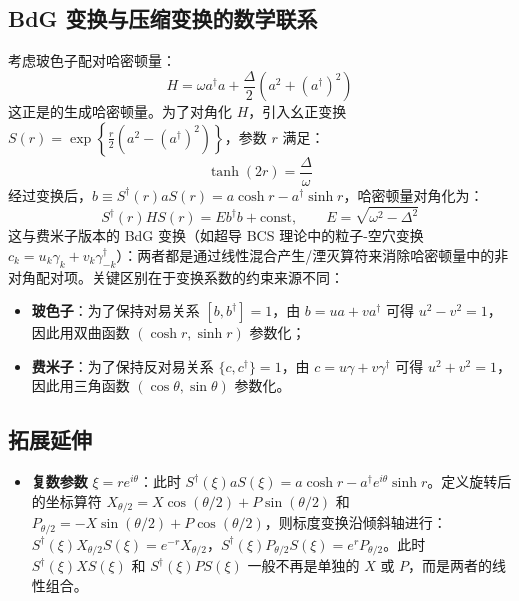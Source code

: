 \subsection{BdG 变换与压缩变换的数学联系}

考虑玻色子配对哈密顿量：
\[
H = \omega a^\dagger a + \frac{\Delta}{2}\left( a^2 + (a^\dagger)^2 \right)
\]
这正是的生成哈密顿量。为了对角化 $H$，引入幺正变换 $S(r) = \exp\left\{ \frac{r}{2}(a^2 - (a^\dagger)^2) \right\}$，参数 $r$ 满足：
\[
\tanh(2r) = \frac{\Delta}{\omega}
\]
经过变换后，$b \equiv S^\dagger(r) a S(r) = a \cosh r - a^\dagger \sinh r$，哈密顿量对角化为：
\[
S^\dagger(r) H S(r) = E b^\dagger b + \text{const}, \qquad E = \sqrt{\omega^2 - \Delta^2}
\]
这与费米子版本的 BdG 变换（如超导 BCS 理论中的粒子-空穴变换 $c_k = u_k \gamma_k + v_k \gamma_{-k}^\dagger$）：两者都是通过线性混合产生/湮灭算符来消除哈密顿量中的非对角配对项。关键区别在于变换系数的约束来源不同：
\begin{itemize}
    \item \textbf{玻色子}：为了保持对易关系 $[b, b^\dagger] = 1$，由 $b = u a + v a^\dagger$ 可得 $u^2 - v^2 = 1$，因此用双曲函数 $(\cosh r, \sinh r)$ 参数化；
    \item \textbf{费米子}：为了保持反对易关系 $\{c, c^\dagger\} = 1$，由 $c = u \gamma + v \gamma^\dagger$ 可得 $u^2 + v^2 = 1$，因此用三角函数 $(\cos\theta, \sin\theta)$ 参数化。
\end{itemize}

\subsection{拓展延伸}

\begin{itemize}
    \item \textbf{复数参数} $\xi = r e^{i\theta}$：此时 $S^\dagger(\xi) a S(\xi) = a \cosh r - a^\dagger e^{i\theta} \sinh r$。定义旋转后的坐标算符 $X_{\theta/2} = X \cos(\theta/2) + P \sin(\theta/2)$ 和 $P_{\theta/2} = -X \sin(\theta/2) + P \cos(\theta/2)$，则标度变换沿倾斜轴进行：$S^\dagger(\xi) X_{\theta/2} S(\xi) = e^{-r} X_{\theta/2}$，$S^\dagger(\xi) P_{\theta/2} S(\xi) = e^{r} P_{\theta/2}$。此时 $S^\dagger(\xi) X S(\xi)$ 和 $S^\dagger(\xi) P S(\xi)$ 一般不再是单独的 $X$ 或 $P$，而是两者的线性组合。
\end{itemize}

\newpage


\newpage

\newpage

\newpage

\newpage

\newpage

\newpage

\newpage
